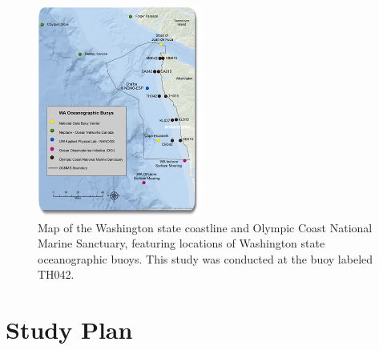 \documentclass[12pt,twoside]{reedthesis}
\begin{document}
{\begin{figure}
	\begin{center}
		\includegraphics[width=0.48\textwidth]{Fig_OCNMS_buoy_map}
		\caption[Map of oceanographic moorings in OCNMS]{\footnotesize{Map of the Washington state coastline and Olympic Coast National Marine Sanctuary, featuring locations of Washington state oceanographic buoys. This study was conducted at the buoy labeled TH042. }} %
		\label{OCNMSbuoys}
	\end{center}
\end{figure} 

\section{Study Plan}


}
\end{document}
